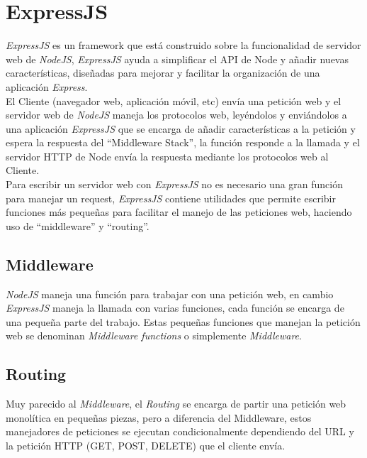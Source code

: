 \section{ExpressJS}
\label{sec:express_js}
  \emph{ExpressJS} es un framework que está construido sobre la funcionalidad de servidor web de \emph{NodeJS}, \emph{ExpressJS} ayuda a simplificar el API de Node y añadir nuevas características, diseñadas para mejorar y facilitar la organización de una aplicación \emph{Express}. \cite{understanding_express}\\

  El Cliente (navegador web, aplicación móvil, etc) envía una petición web y el servidor web de \emph{NodeJS} maneja los protocolos web, ley\'endolos y envi\'andolos a una aplicación \emph{ExpressJS} que se encarga de añadir características a la petición y espera la respuesta del ``Middleware Stack'', la función responde a la llamada y el servidor HTTP de Node envía la respuesta mediante los protocolos web al Cliente.\\

  Para escribir un servidor web con \emph{ExpressJS}  no es necesario una gran función para manejar un request, \emph{ExpressJS} contiene utilidades que permite escribir funciones más pequeñas para facilitar el manejo de las peticiones web, haciendo uso de ``middleware'' y ``routing''.

  \subsection{Middleware}
  \label{sub:middleware}
    \emph{NodeJS} maneja una función para trabajar con una petición web, en cambio \emph{ExpressJS} maneja la llamada con varias funciones, cada función se encarga de una pequeña parte del trabajo. Estas pequeñas funciones que manejan la petición web se denominan \emph{Middleware functions} o simplemente \emph{Middleware}.


  \subsection{Routing}
  \label{sub:routing}
    Muy parecido al \emph{Middleware}, el \emph{Routing} se encarga de partir una petición web monolítica en pequeñas piezas, pero a diferencia del Middleware, estos manejadores de peticiones se ejecutan condicionalmente dependiendo del URL y la petición HTTP (GET, POST, DELETE) que el cliente envía.\\

